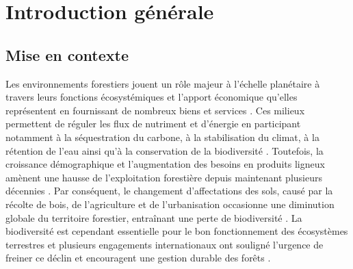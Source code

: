 \chapter*{Introduction générale}         %
\label{chap-introduction}       %


\section*{Mise en contexte}
\label{sec:contexte}

Les environnements forestiers jouent un rôle majeur à l’échelle planétaire à travers leurs fonctions écosystémiques et l'apport économique qu’elles représentent en fournissant de nombreux biens et services \citep{Balvanera2006Quantifyingevidence}. 
Ces milieux permettent de réguler les flux de nutriment et d’énergie en participant notamment à la séquestration du carbone, à la stabilisation du climat, à la rétention de l’eau ainsi qu’à la conservation de la biodiversité \citep{Balvanera2006Quantifyingevidence,Diaz2006BiodiversityLoss,Canadell2008Managingforests,Pawson2013Plantationforests}. 
Toutefois, la croissance démographique et l’augmentation des besoins en produits ligneux amènent une hausse de l’exploitation forestière depuis maintenant plusieurs décennies \citep{Foley2005GlobalConsequences}. 
Par conséquent, le changement d’affectations des sols, causé par la récolte de bois, de l’agriculture et de l’urbanisation occasionne une diminution globale du territoire forestier, entraînant une perte de biodiversité \citep{Bengtsson2000Biodiversitydisturbances,Sala2000Globalbiodiversity,Naeem2012functionsbiological,Bichet2016Maintaininganimal}. 
La biodiversité est cependant essentielle pour le bon fonctionnement des écosystèmes terrestres et plusieurs engagements internationaux ont souligné l'urgence de freiner ce déclin et encouragent une gestion durable des forêts \citep{Newbold2015Globaleffects}. 

